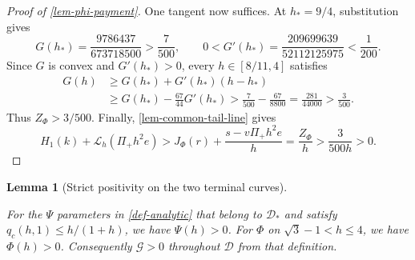 \documentclass[11pt,a4paper]{article}
\theoremstyle{proofmanuscript}
\newtheorem{lemma}[theorem]{Lemma}
\begin{document}
\begin{proof}[Proof of \ref{lem-phi-payment}]
One tangent now suffices. At \(h_*=9/4\), substitution gives \[
G(h_*)=\frac{9786437}{673718500}>\frac7{500},\qquad
0<G'(h_*)=\frac{209699639}{52112125975}<\frac1{200}.
\] Since \(G\) is convex and \(G'(h_*)>0\), every \(h\in[8/11,4]\) satisfies \[
\begin{aligned}
G(h)&\ge G(h_*)+G'(h_*)(h-h_*)\\
&\ge G(h_*)-\frac{67}{44}G'(h_*)
>\frac7{500}-\frac{67}{8800}
=\frac{281}{44000}>\frac3{500}.
\end{aligned}
\] Thus \(Z_\Phi>3/500\). Finally, \ref{lem-common-tail-line} gives \[
H_1(k)+\mathcal L_h(\Pi_+h^2e)
>J_\Phi(r)+\frac{s-v\Pi_+h^2e}{h}=\frac{Z_\Phi}{h}>\frac3{500h}>0.
\]

\end{proof}

\begin{lemma}[Strict positivity on the two terminal curves]\label{lem-terminal}

For the \(\Psi\) parameters in \ref{def-analytic} that belong to \(\mathcal D_*\) and satisfy \(q_c(h,1)\le h/(1+h)\), we have \(\Psi(h)>0\). For \(\Phi\) on \(\sqrt3-1<h\le4\), we have \(\Phi(h)>0\). Consequently \(\mathcal G>0\) throughout \(\mathcal D\) from that definition.

\end{lemma}
\end{document}
